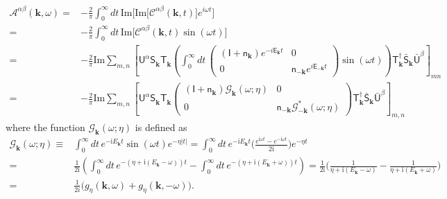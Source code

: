 \documentclass[aps, prx, nofootinbib, superscriptaddress]{revtex4-2}
\newcommand{\kvec}{\mathbf{k}}
\newcommand{\ri}{\mathrm{i}}
\begin{document}
\begin{equation}
    \begin{split}
        \mathcal{A}^{\alpha\beta}(\kvec, \omega) 
        = & - \frac{2}{\pi} \int_{0}^{\infty} dt \, \mathrm{Im} \big[ \mathrm{Im} \big[ \mathcal{C}^{\alpha\beta}(\kvec, t) \big] e^{i \omega t} \big] \\
        = & - \frac{2}{\pi} \int_{0}^{\infty} dt \, \mathrm{Im} \big[ \mathcal{C}^{\alpha\beta}(\kvec, t) \sin (\omega t) \big] \\
        = & - \frac{2}{\pi} \mathrm{Im} 
        \sum_{m,n}
        \left[ 
        \mathsf{U}^{\alpha} \mathsf{S}_{\kvec}^{\phantom \dagger} \mathsf{T}_{\kvec}^{\phantom \dagger}
        \left( \int_{0}^{\infty} dt \, 
        \begin{pmatrix}
            (\mathsf{I} + \mathsf{n}_{\kvec}) e^{- i \mathsf{E}_{\kvec} t} & 0 \\
            0 & \mathsf{n}_{-\kvec} e^{i \mathsf{E}_{-\kvec} t}
        \end{pmatrix}
        \sin (\omega t)
        \right)
        \mathsf{T}^{\dagger}_{\kvec} \bar{\mathsf{S}}_{\kvec}^{\phantom \dagger} \bar{\mathsf{U}}^{\beta}
        \right]_{mn} \\
        = & -  \frac{2}{\pi} \mathrm{Im} 
        \sum_{m,n}
        \left[ 
            \mathsf{U}^{\alpha} \mathsf{S}_{\kvec}^{\phantom \dagger} \mathsf{T}_{\kvec}^{\phantom \dagger}
            \begin{pmatrix}
                (\mathsf{I + n}_{  \kvec}) \mathcal{G}_{\kvec} (\omega ; \eta) & 0 \\
                0 &  \mathsf{n}_{- \kvec} \mathcal{G}_{-\kvec}^{*} (\omega ; \eta)
            \end{pmatrix}
            \mathsf{T}^{\dagger}_{\kvec} \bar{\mathsf{S}}_{\kvec}^{\phantom \dagger}
            \bar{\mathsf{U}}^{\beta}
        \right]_{m,n}
    \end{split}
\end{equation}
where the function $\mathcal{G}_{\kvec}(\omega ; \eta)$ is defined as 
\begin{align*}
     \mathcal{G}_{\kvec}(\omega ; \eta)
     \equiv & \int_{0}^{\infty} dt \,  e^{- \ri E_{\kvec} t} \sin (\omega t) e^{-\eta |t|} 
     = \int_{0}^{\infty} dt \,  e^{-\ri E_{\kvec} t} \bigg( \frac{e^{\ri \omega t} - e^{- \ri \omega t}}{2\ri} \bigg) e^{-\eta t} \\
     = & \frac{1}{2 \ri} 
     \left( 
     \int_{0}^{\infty} dt \,
     e^{-(\eta + \ri(E_{\kvec} - \omega))t} - \int_{0}^{\infty} dt \, e^{-(\eta + \ri(E_{\kvec} + \omega))t} 
     \right) 
     = \frac{1}{2 \ri} \Big( \frac{1}{\eta + \ri(E_{\kvec} - \omega)} - \frac{1}{\eta + \ri(E_{\kvec} + \omega)} \Big) \\
     = & \frac{1}{2i} \big( g_{\eta}(\kvec, \omega) + g_{\eta} (\kvec, - \omega) \big).
\end{align*}
\end{document}
